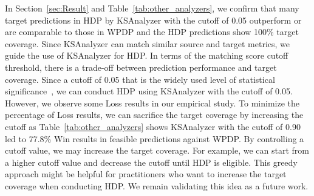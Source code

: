 In Section~\ref{sec:Result} and Table~\ref{tab:other_analyzers}, we confirm
that many target predictions in HDP by KSAnalyzer with the cutoff of 0.05
outperform or are comparable to those in WPDP and the HDP predictions show 100\% target coverage.
Since KSAnalyzer can match similar source and target metrics, we guide the use
of KSAnalyzer for HDP. In terms of the matching score cutoff threshold, there is a
trade-off between prediction performance and target coverage. Since a cutoff
of 0.05 that is the widely used level of statistical
significance~\cite{Corder09}, we can conduct HDP using KSAnalyzer with the
cutoff of 0.05. However, we observe some Loss results in our empirical study.
To minimize the percentage of Loss results, we can sacrifice the target coverage
by increasing the cutoff as Table~\ref{tab:other_analyzers} shows KSAnalyzer with
the cutoff of 0.90 led to 77.8\% Win results in feasible predictions against
WPDP.
By controlling a cutoff value, we may increase the target coverage.
For example, we can start from a higher cutoff value and decrease the cutoff until HDP is eligible.
This greedy approach might be helpful for practitioners who want to increase the target coverage when conducting HDP.
We remain validating this idea as a future work.

% 

